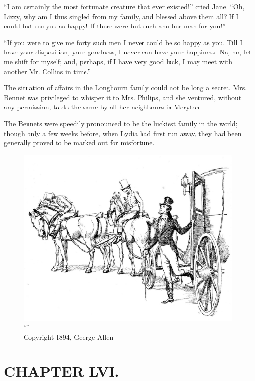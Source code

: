 ``I am certainly the most fortunate creature that ever existed!'' cried Jane. ``Oh, Lizzy, why am I thus singled from my family, and blessed above them all? If I could but see you as happy! If there were but such another man for you!''

``If you were to give me forty such men I never could be so happy as you. Till I have your disposition, your goodness, I never can have your happiness. No, no, let me shift for myself; and, perhaps, if I have very good luck, I may meet with another Mr. Collins in time.''

The situation of affairs in the Longbourn family could not be long a secret. Mrs. Bennet was privileged to whisper it to Mrs. Philips, and she ventured, without any permission, to do the same by all her neighbours in Meryton.

The Bennets were speedily pronounced to be the luckiest family in the world; though only a few weeks before, when Lydia had first run away, they had been generally proved to be marked out for misfortune.

\begin{figure}[htbp]
    \centering
    \includegraphics[width=\textwidth]{illustrations/i_031.jpg}
    \caption{“”\\ Copyright 1894, George Allen}
    \label{fig:image}
\end{figure}


\chapter{CHAPTER LVI.}

